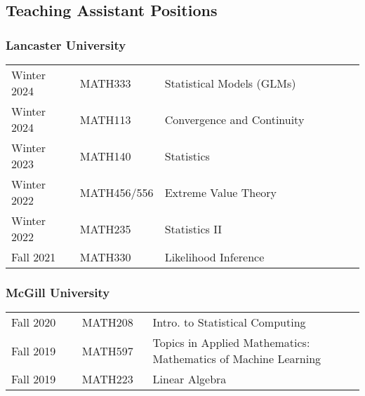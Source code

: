 \documentclass[11pt,]{scrartcl}
\begin{document}
\subsection{Teaching Assistant Positions}\label{teaching-assistant}
\subsubsection{Lancaster University}
\begin{table}[!h]
{\def\arraystretch{1.1}\tabcolsep=0pt
\begin{tabular}{p{0.20\linewidth}p{0.20\linewidth}p{0.60\linewidth}}
  
  Winter 2024 & MATH333 & Statistical Models (GLMs)\\
  Winter 2024 & MATH113 & Convergence and Continuity\\
  Winter 2023 & MATH140 & Statistics \\
  Winter 2022 & MATH456/556 & Extreme Value Theory \\
  Winter 2022 & MATH235 & Statistics II \\
  
  Fall 2021 & MATH330 & Likelihood Inference 
\end{tabular}%
}
\end{table}
\newpage
\subsubsection{McGill University}
\begin{table}[!h]
{\def\arraystretch{1.1}\tabcolsep=0pt
\begin{tabular}{p{0.20\linewidth}p{0.20\linewidth}p{0.60\linewidth}}

  Fall 2020 & MATH208 & Intro. to Statistical Computing \\

  Fall 2019 & MATH597 & Topics in Applied Mathematics: Mathematics of Machine Learning  \\
  
  Fall 2019 & MATH223 & Linear Algebra  \\
\end{tabular}%
}
\end{table}
\end{document}
